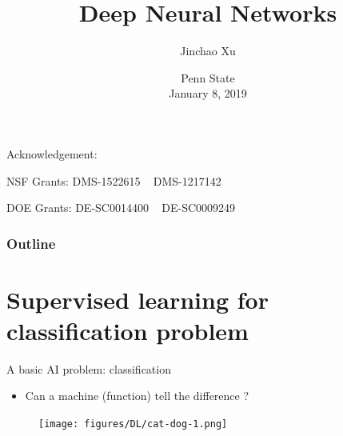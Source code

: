 \documentclass{beamer}
\begin{document}
\begin{CJK*}{UTF8}{gbsn}


\title[DNN \& FEM]
{Deep Neural Networks}

\author[Xu]{Jinchao Xu}


\date[PSU]{Penn State \\ January 8, 2019}

\begin{frame}
\titlepage

{\footnotesize
	\centerline{Acknowledgement: }
	\centerline{{\color{blue} NSF Grants}: DMS-1522615 ~ DMS-1217142}
	\centerline{{\color{blue} DOE Grants}: DE-SC0014400 ~ DE-SC0009249}
}
\end{frame}


\begin{frame}
\frametitle{Outline} 
\setcounter{tocdepth}{2}
\tableofcontents
\end{frame}

\section{Supervised learning for classification problem}
\begin{frame}{A basic AI problem: classification}
\begin{itemize}
	\item Can a machine (function) tell the difference ?
\end{itemize}

\begin{figure}
	\begin{center}
		\texttt{[image: figures/DL/cat-dog-1.png]} 
	\end{center}
\end{figure}

\end{frame}


\end{CJK*}
\end{document}
